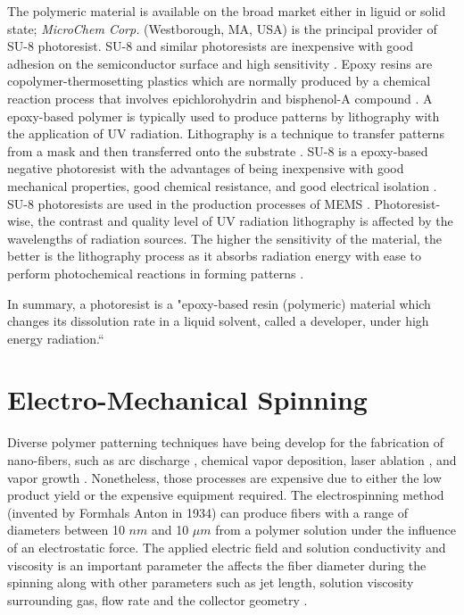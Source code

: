 The polymeric material is available on the broad market either in liguid or solid state; \emph{MicroChem Corp.} (Westborough, MA, USA) is the principal provider of SU-8 photoresist. SU-8 and similar photoresists are inexpensive with good adhesion on the semiconductor surface and high sensitivity \cite{Staab2011}. Epoxy resins are copolymer-thermosetting plastics which are normally produced by a chemical reaction process that involves epichlorohydrin and bisphenol-A compound \cite{Singla2010}. A epoxy-based polymer is typically used to produce patterns by lithography with the application of UV radiation. Lithography is a technique to transfer patterns from a mask and then transferred onto the substrate \cite{Landis2011,Xu2014}. SU-8 is a epoxy-based negative photoresist with the advantages of being inexpensive with good mechanical properties, good chemical resistance, and good electrical isolation \cite{Xu2014}. SU-8 photoresists are used in the production processes of MEMS \cite{Zhang2001}. Photoresist-wise, the contrast and quality level of UV radiation lithography is affected by the wavelengths of radiation sources. The higher the sensitivity of the material, the better is the lithography process as it absorbs radiation energy with ease to perform photochemical reactions in forming patterns \cite{Zhang2001}.

In summary, a photoresist is a "epoxy-based resin (polymeric) material which changes its dissolution rate in a liquid solvent, called a developer, under high energy radiation.`` \cite{Landis2011}

\section{Electro-Mechanical Spinning}
Diverse polymer patterning techniques have being develop for the fabrication of nano-fibers, such as arc discharge \cite{Wang2007}, chemical vapor deposition, laser ablation \cite{Ren1998}, and vapor growth \cite{Nadarajah2008}. Nonetheless, those processes are expensive due to either the low product yield or the expensive equipment required. The electrospinning method (invented by Formhals Anton in 1934) can produce fibers with a range of diameters between 10 $n m$ and 10 $\mu m$ \cite{Jayaraman2003,Anton1930} from a polymer solution under the influence of an electrostatic force. The applied electric field and solution conductivity and viscosity is an important parameter the affects the fiber diameter during the spinning along with other parameters such as jet length, solution viscosity surrounding gas, flow rate and the collector geometry \cite{Anton1938,Larrondo1981,Baumgarten1971,Shin2001}.

